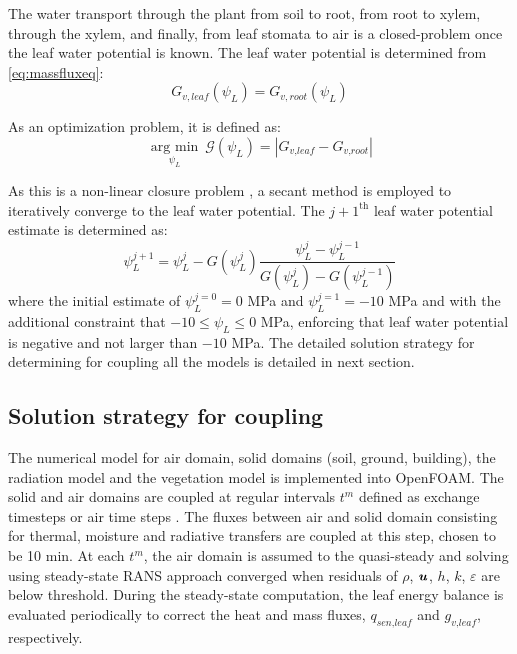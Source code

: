 The water transport through the plant from soil to root, from root to xylem, through the xylem, and finally, from leaf stomata to air is a closed-problem once the leaf water potential is known. The leaf water potential is determined from \cref{eq:massfluxeq}:
\begin{equation}
G_{v,leaf}(\psi_L) = G_{v,root} (\psi_L)
\end{equation}

As an optimization problem, it is defined as:
\begin{equation}
\mathop {\mathrm{arg\ min} }\limits_{\psi_L}~\mathcal{G}(\psi _L) = \left| {{G_{\textit{v,leaf}}} - {G_{\textit{v,root}}}} \right|
\end{equation}

As this is a non-linear closure problem \citep{Manoli2014},  a secant method is employed to iteratively converge to the leaf water potential. The $j+1^\mathrm{th}$ leaf water potential estimate is determined as:
\begin{equation}
\psi_L^{j+1} = \psi_L^{j} - G(\psi_L^j) \frac{\psi_L^j - \psi_L^{j-1}}{G\left(\psi_L^j\right) - G\left(\psi_L^{j-1}\right) }
\end{equation}
where the initial estimate of $\psi_L^{j=0} = 0$ MPa and $\psi_L^{j=1} = -10$ MPa and with the additional constraint that $-10 \le \psi_L \le 0$ MPa, enforcing that leaf water potential is negative and not larger than $-10$ MPa. The detailed solution strategy for determining for coupling all the models is detailed in next section.

\subsection{Solution strategy for coupling}

The numerical model for air domain, solid domains (soil, ground, building), the radiation model and the vegetation model is implemented into OpenFOAM. The solid and air domains are coupled at regular intervals $t^m$ defined as exchange timesteps or air time steps \citep{Saneinejad2014,Kubilay2018}. The fluxes between air and solid domain consisting for thermal, moisture and radiative transfers are coupled at this step, chosen to be 10 min. At each $t^m$, the air domain is assumed to the quasi-steady and solving using steady-state RANS approach converged when residuals of $\rho$, $\textbf{\textit{u}}$, $h$, $k$, $\varepsilon$ are below threshold. During the steady-state computation, the leaf energy balance is evaluated periodically to correct the heat and mass fluxes, $q_{\textit{sen,leaf}}$ and $g_{\textit{v,leaf}}$, respectively. 

